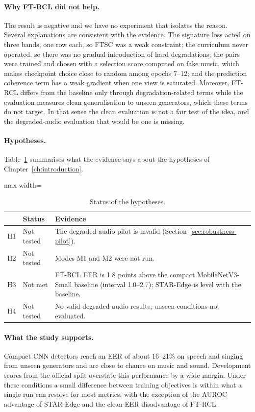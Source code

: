 \paragraph{Why FT-RCL did not help.} The result is negative and we have no experiment that isolates the reason. Several explanations are consistent with the evidence. The signature loss acted on three bands, one row each, so FTSC was a weak constraint; the curriculum never operated, so there was no gradual introduction of hard degradations; the pairs were trained and chosen with a selection score computed on fake music, which makes checkpoint choice close to random among epochs 7--12; and the prediction coherence term has a weak gradient when one view is saturated. Moreover, FT-RCL differs from the baseline only through degradation-related terms while the evaluation measures clean generalisation to unseen generators, which these terms do not target. In that sense the clean evaluation is not a fair test of the idea, and the degraded-audio evaluation that would be one is missing.

\paragraph{Hypotheses.} Table~\ref{tab:hypotheses} summarises what the evidence says about the hypotheses of Chapter~\ref{ch:introduction}.

\begin{table}[htbp]
\centering
\caption{Status of the hypotheses.}
\label{tab:hypotheses}
\small
\begin{adjustbox}{max width=\textwidth}
\begin{tabular}{@{}lp{3.6cm}p{8cm}@{}}
\toprule
 & Status & Evidence \\
\midrule
H1 & Not tested & The degraded-audio pilot is invalid (Section~\ref{sec:robustness-pilot}). \\
H2 & Not tested & Modes M1 and M2 were not run. \\
H3 & Not met & FT-RCL EER is 1.8 points above the compact MobileNetV3-Small baseline (interval 1.0--2.7); STAR-Edge is level with the baseline. \\
H4 & Not tested & No valid degraded-audio results; unseen conditions not evaluated. \\
\bottomrule
\end{tabular}
\end{adjustbox}
\end{table}

\paragraph{What the study supports.} Compact CNN detectors reach an EER of about 16--21\% on speech and singing from unseen generators and are close to chance on music and sound. Development scores from the official split overstate this performance by a wide margin. Under these conditions a small difference between training objectives is within what a single run can resolve for most metrics, with the exception of the AUROC advantage of STAR-Edge and the clean-EER disadvantage of FT-RCL.
